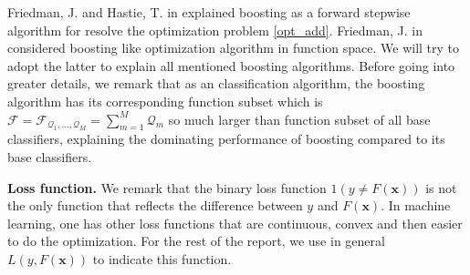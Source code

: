 \documentclass[a4paper,twoside,12pt]{article}
\begin{document}
Friedman, J. and Hastie, T. in \cite{boost} explained boosting as a forward stepwise algorithm for resolve the optimization problem \eqref{opt_add}. Friedman, J. in \cite{trebst} considered boosting like optimization algorithm in function space. We will try to adopt the latter to explain all mentioned boosting algorithms. Before going into greater details, we remark that as an classification algorithm, the boosting algorithm has its corresponding function subset which is $\mathcal{F} = \mathcal{F}_{\mathcal{Q}_1,...,\mathcal{Q}_M} = \sum\limits_{m=1}^M \mathcal{Q}_m$ so much larger than function subset of all base classifiers, explaining the dominating performance of boosting compared to its base classifiers.

\textbf{Loss function.} We remark that the binary loss function $1(y \neq F(\textbf{x}))$ is not the only function that reflects the difference between $y$ and $F(\textbf{x})$. In machine learning, one has other loss functions that are continuous, convex and then easier to do the optimization. For the rest of the report, we use in general $L(y, F(\textbf{x}))$ to indicate this function.
\end{document}
